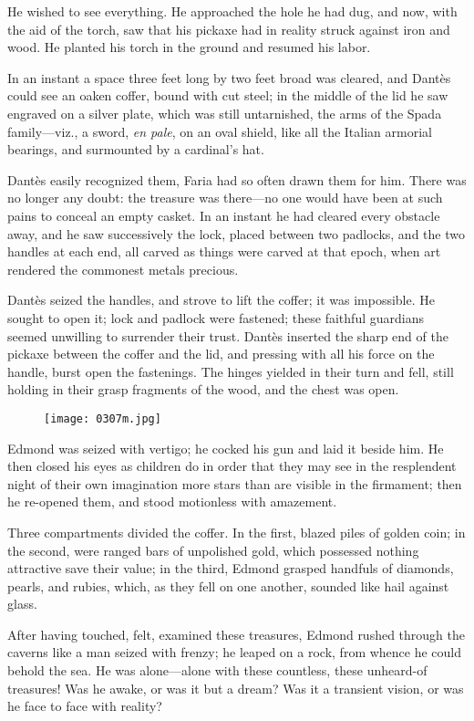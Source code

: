 He wished to see everything. He approached the hole he had dug, and
now, with the aid of the torch, saw that his pickaxe had in reality
struck against iron and wood. He planted his torch in the ground and
resumed his labor.

In an instant a space three feet long by two feet broad was cleared,
and Dantès could see an oaken coffer, bound with cut steel; in the
middle of the lid he saw engraved on a silver plate, which was still
untarnished, the arms of the Spada family—viz., a sword, \textit{en pale}, on
an oval shield, like all the Italian armorial bearings, and surmounted
by a cardinal’s hat.

Dantès easily recognized them, Faria had so often drawn them for him.
There was no longer any doubt: the treasure was there—no one would have
been at such pains to conceal an empty casket. In an instant he had
cleared every obstacle away, and he saw successively the lock, placed
between two padlocks, and the two handles at each end, all carved as
things were carved at that epoch, when art rendered the commonest
metals precious.

Dantès seized the handles, and strove to lift the coffer; it was
impossible. He sought to open it; lock and padlock were fastened; these
faithful guardians seemed unwilling to surrender their trust. Dantès
inserted the sharp end of the pickaxe between the coffer and the lid,
and pressing with all his force on the handle, burst open the
fastenings. The hinges yielded in their turn and fell, still holding in
their grasp fragments of the wood, and the chest was open.

\begin{figure}[h]
\texttt{[image: 0307m.jpg]}
\end{figure}

Edmond was seized with vertigo; he cocked his gun and laid it beside
him. He then closed his eyes as children do in order that they may see
in the resplendent night of their own imagination more stars than are
visible in the firmament; then he re-opened them, and stood motionless
with amazement.

Three compartments divided the coffer. In the first, blazed piles of
golden coin; in the second, were ranged bars of unpolished gold, which
possessed nothing attractive save their value; in the third, Edmond
grasped handfuls of diamonds, pearls, and rubies, which, as they fell
on one another, sounded like hail against glass.

After having touched, felt, examined these treasures, Edmond rushed
through the caverns like a man seized with frenzy; he leaped on a rock,
from whence he could behold the sea. He was alone—alone with these
countless, these unheard-of treasures! Was he awake, or was it but a
dream? Was it a transient vision, or was he face to face with reality?

